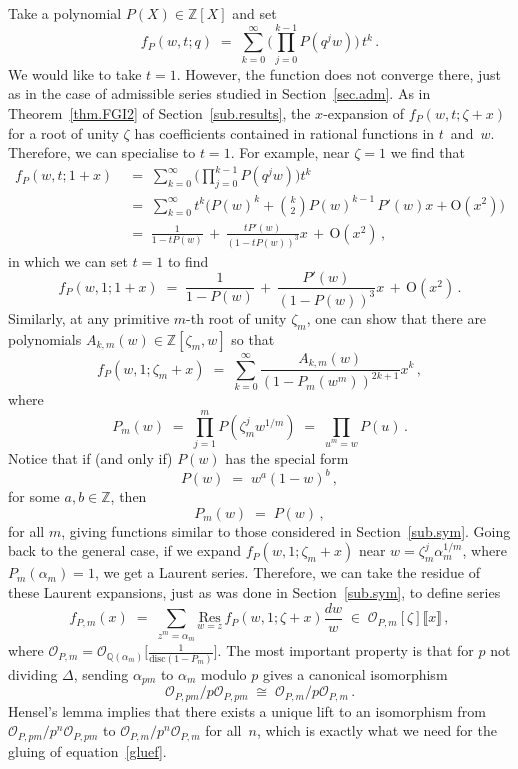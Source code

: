 \documentclass[12pt,reqno]{amsart}
\theoremstyle{definition}
\def\BZ{\mathbb Z}
\def\BQ{\mathbb Q}
\def\Res#1{\underset{#1}{\mathrm{Res}}\,}
\def\a{\alpha}
\def\be{\begin{equation}}
\def\ee{\end{equation}}
\def\z{\zeta}
\def\calO{\mathcal{O}}
\def\={\;=\;}
\def\inn{\;\in\;}
\def\+{\,+\,}
\begin{document}
Take a polynomial $P(X)\in\BZ[X]$ and set
\be
f_{P}(w,t;q)
\=
\sum_{k=0}^{\infty}\bigg(\prod_{j=0}^{k-1}P(q^jw)\bigg)\,t^k\,.
\ee
We would like to take $t=1$. However, the function does not converge there, just
as in the case of admissible series studied in Section~\ref{sec.adm}.
As in Theorem~\ref{thm.FGI2} of Section~\ref{sub.results}, the $x$-expansion
of $f_{P}(w,t;\z+x)$ for a root of unity $\z$ has coefficients contained in rational
functions in $t$~and~$w$. Therefore, we can specialise to $t=1$.
For example, near $\z=1$ we find that
\be
\begin{aligned}
f_{P}(w,t;1+x)
&\=
\sum_{k=0}^{\infty}\bigg(\prod_{j=0}^{k-1}P(q^jw)\bigg)t^k\\
&\=
\sum_{k=0}^{\infty}t^k\Big(P(w)^k+\binom{k}{2}P(w)^{k-1}\,P'(w)x+\mathrm{O}(x^2)\Big)
\\
&\=
\frac{1}{1-tP(w)}\+\frac{tP'(w)}{(1-tP(w))^3}x\+\mathrm{O}(x^2)\,,
\end{aligned}
\ee
in which we can set $t=1$ to find
\be
f_{P}(w,1;1+x)
\=
\frac{1}{1-P(w)}\+\frac{P'(w)}{(1-P(w))^3}x\+\mathrm{O}(x^2)\,.
\ee
Similarly, at any primitive $m$-th root of unity $\z_m$,
one can show that there are polynomials $A_{k,m}(w)\in\BZ[\z_m,w]$ so that
\be
f_{P}(w,1;\z_m+x)
\=
\sum_{k=0}^{\infty}\frac{A_{k,m}(w)}{(1-P_m(w^m))^{2k+1}}x^k\,,
\ee
where
\be
P_m(w)
\=
\prod_{j=1}^{m}P(\z_m^jw^{1/m})
\=
\prod_{u^m=w}P(u)\,.
\ee
Notice that if (and only if) $P(w)$ has the special form
\be
P(w)\=w^a(1-w)^b\,,
\ee
for some $a,b\in\BZ$, then
\be
P_{m}(w)\=P(w)\,,
\ee
for all $m$, giving functions similar to those considered in Section~\ref{sub.sym}.
Going back to the general case, if we expand $f_P(w,1;\z_m+x)$ near
$w=\z_m^j\a_m^{1/m}$, where $P_m(\a_m)=1$, we get a Laurent series.
Therefore, we can take the residue of these Laurent expansions, just as was done
in Section~\ref{sub.sym}, to define series
\be
f_{P,m}(x)
\=
\sum_{z^m=\a_m}\Res{w=z}
f_{P}(w,1;\z+x)
\frac{dw}{w}
\inn\mathcal{O}_{P,m}[\z]\llbracket x\rrbracket\,,
\ee
where $\mathcal{O}_{P,m}=\mathcal{O}_{\BQ(\a_m)}\big[\frac{1}{\mathrm{disc}(1-P_m)}\big]$.
The most important property is that for $p$ not dividing $\Delta$,
sending $\alpha_{pm}$ to $\alpha_m$ modulo $p$ gives a canonical isomorphism
\be
\label{eq:weird.elts.iso}
\calO_{P,pm}/p\calO_{P,pm}
\;\cong\;
\calO_{P,m}/p\calO_{P,m}\,.
\ee
Hensel's lemma implies that there exists a unique lift to an isomorphism from
$\calO_{P,pm}/p^n\calO_{P,pm}$ to $\calO_{P,m}/p^n\calO_{P,m}$ for all~$n$, which is
exactly what we need for the gluing of equation~\eqref{gluef}.
\end{document}
